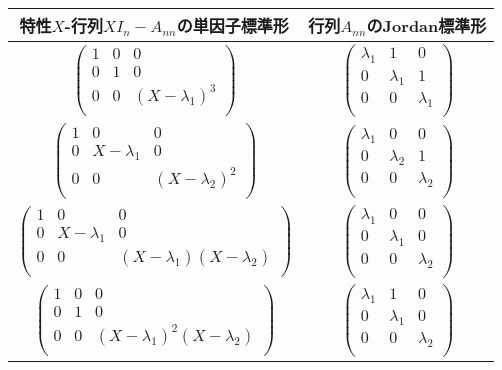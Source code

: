 \documentclass[dvipdfmx]{jsarticle}
\begin{document}
\begin{longtable}[c]{|c|c|}
\hline
特性$X$-行列$XI_{n} - A_{nn}$の単因子標準形 & 行列$A_{nn}$のJordan標準形 \\
\hline \hline 
$\begin{pmatrix}
1 & 0 & 0 \\
0 & 1 & 0 \\
0 & 0 & \left( X - \lambda_{1} \right)^{3} \\
\end{pmatrix}$ & $\begin{pmatrix}
\lambda_{1} & 1 & 0 \\
0 & \lambda_{1} & 1 \\
0 & 0 & \lambda_{1} \\
\end{pmatrix}$ \\
\hline
$\begin{pmatrix}
1 & 0 & 0 \\
0 & X - \lambda_{1} & 0 \\
0 & 0 & \left( X - \lambda_{2} \right)^{2} \\
\end{pmatrix}$ & $\begin{pmatrix}
\lambda_{1} & 0 & 0 \\
0 & \lambda_{2} & 1 \\
0 & 0 & \lambda_{2} \\
\end{pmatrix}$ \\
\hline
$\begin{pmatrix}
1 & 0 & 0 \\
0 & X - \lambda_{1} & 0 \\
0 & 0 & \left( X - \lambda_{1} \right)\left( X - \lambda_{2} \right) \\
\end{pmatrix}$ & $\begin{pmatrix}
\lambda_{1} & 0 & 0 \\
0 & \lambda_{1} & 0 \\
0 & 0 & \lambda_{2} \\
\end{pmatrix}$ \\
\hline
$\begin{pmatrix}
1 & 0 & 0 \\
0 & 1 & 0 \\
0 & 0 & \left( X - \lambda_{1} \right)^{2}\left( X - \lambda_{2} \right) \\
\end{pmatrix}$ & $\begin{pmatrix}
\lambda_{1} & 1 & 0 \\
0 & \lambda_{1} & 0 \\
0 & 0 & \lambda_{2} \\
\end{pmatrix}$ \\
\hline
\end{longtable}
\end{document}
